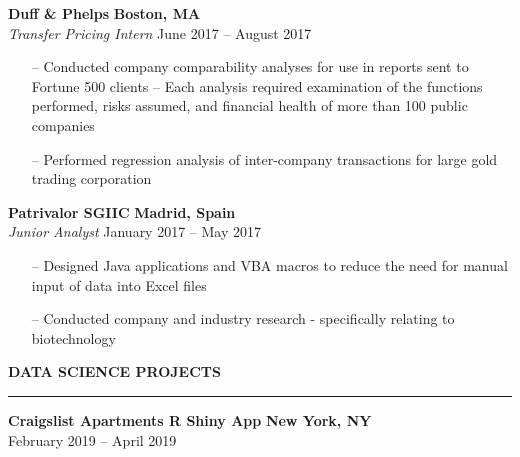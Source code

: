 \documentclass[paper=a4, fontsize=11pt]{scrartcl} %
\newcommand{\I}{--}
\newenvironment{mycenter}[1][\topsep]
{\setlength{\topsep}{#1}\par\kern\topsep\centering}%
{\par\kern\topsep}%
\begin{document}
\vspace{1mm}

 

\textbf{Duff \& Phelps} \hfill \textbf{Boston, MA}\\
\textit{Transfer Pricing Intern}
\hfill June 2017 -- August 2017

\begin{itemize}[topsep=0pt,noitemsep]

  \item[\I] Conducted company comparability analyses for use in reports sent to Fortune 500 clients -- Each analysis required examination of the functions performed, risks assumed, and financial health of more than 100 public companies

  \item[\I] Performed regression analysis of inter-company transactions for large gold trading corporation

\end{itemize}

 

\vspace{1mm}

\textbf{Patrivalor SGIIC} \hfill \textbf{Madrid, Spain}\\
\textit{Junior Analyst}
\hfill January 2017 -- May 2017
\begin{itemize}[topsep=0pt,noitemsep]
  \item[\I] Designed Java applications and VBA macros to reduce the need for manual input of data into Excel files
  \item[\I] Conducted company and industry research - specifically relating to biotechnology

\end{itemize}

 

\vspace{2mm}

\begin{mycenter}[0pt]

\textsc{\textbf{DATA SCIENCE PROJECTS}}

\end{mycenter}


\vspace{-3mm}

\rule{\textwidth}{0.4pt}

 

 

\textbf{Craigslist Apartments R Shiny App} \hfill \textbf{New York, NY}\\
\hspace*{\fill}  February 2019 -- April 2019
\end{document}
